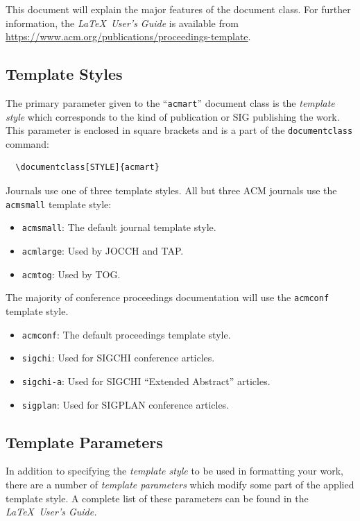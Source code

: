 This document will explain the major features of the document
class. For further information, the {\itshape \LaTeX\ User's Guide} is
available from
\url{https://www.acm.org/publications/proceedings-template}.

\subsection{Template Styles}

The primary parameter given to the ``\verb|acmart|'' document class is
the {\itshape template style} which corresponds to the kind of publication
or SIG publishing the work. This parameter is enclosed in square
brackets and is a part of the {\verb|documentclass|} command:
\begin{verbatim}
  \documentclass[STYLE]{acmart}
\end{verbatim}

Journals use one of three template styles. All but three ACM journals
use the {\verb|acmsmall|} template style:
\begin{itemize}
	\item {\verb|acmsmall|}: The default journal template style.
	\item {\verb|acmlarge|}: Used by JOCCH and TAP.
	\item {\verb|acmtog|}: Used by TOG.
\end{itemize}

The majority of conference proceedings documentation will use the {\verb|acmconf|} template style.
\begin{itemize}
	\item {\verb|acmconf|}: The default proceedings template style.
	      \item{\verb|sigchi|}: Used for SIGCHI conference articles.
	      \item{\verb|sigchi-a|}: Used for SIGCHI ``Extended Abstract'' articles.
	      \item{\verb|sigplan|}: Used for SIGPLAN conference articles.
\end{itemize}

\subsection{Template Parameters}

In addition to specifying the {\itshape template style} to be used in
formatting your work, there are a number of {\itshape template parameters}
which modify some part of the applied template style. A complete list
of these parameters can be found in the {\itshape \LaTeX\ User's Guide.}

